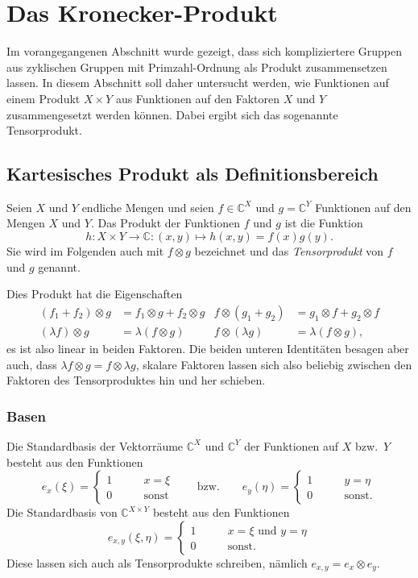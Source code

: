 %
%
%
\section{Das Kronecker-Produkt
\label{buch:diskret:section:tensor}}
Im vorangegangenen Abschnitt wurde gezeigt, dass sich kompliziertere
Gruppen aus zyklischen Gruppen mit Primzahl-Ordnung als Produkt
zusammensetzen lassen.
In diesem Abschnitt soll daher untersucht werden, wie Funktionen auf
einem Produkt $X\times Y$ aus Funktionen auf den Faktoren $X$ und $Y$
zusammengesetzt werden können.
Dabei ergibt sich das sogenannte Tensorprodukt.

%
%
%
\subsection{Kartesisches Produkt als Definitionsbereich
\label{buch:diskret:section:}}
Seien $X$ und $Y$ endliche Mengen und seien $f\in\mathbb{C}^X$ und 
$g=\mathbb{C}^Y$ Funktionen auf den Mengen $X$ und $Y$.
Das Produkt der Funktionen $f$ und $g$ ist die Funktion
\[
h
\colon
X\times Y \to \mathbb{C}
:
(x,y)
\mapsto
h(x,y) = f(x)g(y).
\]
Sie wird im Folgenden auch mit $f\otimes g$ bezeichnet und das
{\em Tensorprodukt} von $f$ und $g$ genannt.
%

Dies Produkt hat die Eigenschaften
\begin{align*}
(f_1+f_2)\otimes g &= f_1\otimes g + f_2\otimes g
&
f\otimes(g_1+g_2) &= g_1\otimes f + g_2\otimes f
\\
(\lambda f)\otimes g &= \lambda (f\otimes g)
&
f\otimes(\lambda g) &= \lambda (f\otimes g),
\end{align*}
es ist also linear in beiden Faktoren.
Die beiden unteren Identitäten besagen aber auch, dass
$\lambda f\otimes g = f\otimes \lambda g$, skalare Faktoren
lassen sich also beliebig zwischen den Faktoren des
Tensorproduktes hin und her schieben.

%
%
\subsubsection{Basen}
Die Standardbasis der Vektorräume $\mathbb{C}^X$ und $\mathbb{C}^Y$
der Funktionen auf $X$ bzw.~$Y$
besteht aus den Funktionen
\[
e_x(\xi)
=
\begin{cases}
1&\qquad x=\xi\\
0&\qquad\text{sonst}
\end{cases}
\qquad\text{bzw.}\qquad
e_y(\eta)
=
\begin{cases}
1&\qquad y=\eta\\
0&\qquad\text{sonst.}
\end{cases}
\]
Die Standardbasis von $\mathbb{C}^{X\times Y}$ besteht aus den Funktionen
\[
e_{x,y}(\xi,\eta)
=
\begin{cases}
1&\qquad\text{$x=\xi$ und $y=\eta$}\\
0&\qquad\text{sonst.}
\end{cases}
\]
Diese lassen sich auch als Tensorprodukte schreiben, nämlich
$e_{x,y} = e_x\otimes e_y$.


